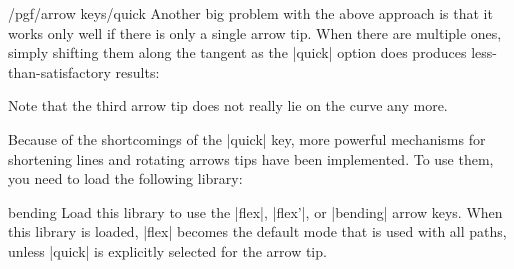\begin{key}{/pgf/arrow keys/quick}
  Another big problem with the above approach is that it works only
  well if there is only a single arrow tip. When there are multiple
  ones, simply shifting them along the tangent as the |quick| option
  does produces less-than-satisfactory results:
\begin{codeexample}[]
\end{codeexample}
  Note that the third arrow tip does not really lie on the curve any 
  more. 
\end{key}

Because of the shortcomings of the |quick| key, more powerful
mechanisms for shortening lines and rotating arrows tips have been
implemented. To use them, you need to load the following library:

\begin{tikzlibrary}{bending}
  Load this library to use the |flex|, |flex'|, or |bending| arrow
  keys. When this library is loaded, |flex| becomes the default mode
  that is used with all paths, unless |quick| is explicitly selected
  for the arrow tip.
\end{tikzlibrary}

